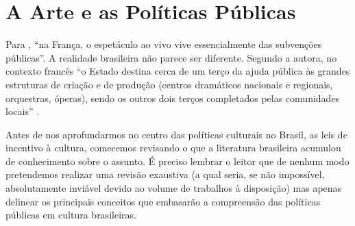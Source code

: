 \documentclass[a4paper, 12pt, openright, oneside, german, french, english, brazil]{abntex2}
\begin{document}
	
	
	
	
	
	
	
	
	\section{A Arte e as Políticas Públicas}
	
	Para , ``na França, o espetáculo ao vivo vive essencialmente das subvenções públicas''. A realidade brasileira não parece ser diferente. Segundo a autora, no contexto francês ``o Estado destina cerca de um terço da ajuda pública às grandes estruturas de criação e de produção (centros dramáticos nacionais e regionais, orquestras, óperas), sendo os outros dois terços completados pelas comunidades locais'' \cite[p. 62]{benhamou2007economia}.
	
	Antes de nos aprofundarmos no centro das políticas culturais no Brasil, as leis de incentivo à cultura, comecemos revisando o que a literatura brasileira acumulou de conhecimento sobre o assunto. É preciso lembrar o leitor que de nenhum modo pretendemos realizar uma revisão exaustiva (a qual seria, se não impossível, absolutamente inviável devido ao volume de trabalhos à disposição) mas apenas delinear os principais conceitos que embasarão a compreensão das políticas públicas em cultura brasileiras.
	
\end{document}
